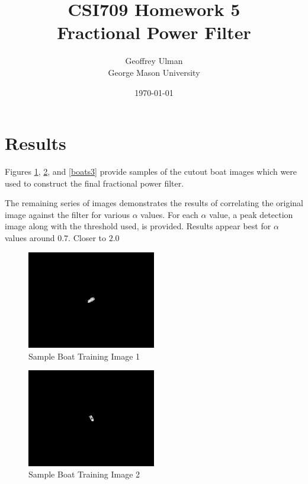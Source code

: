 \documentclass[12pt]{article}
\begin{document}
\title{CSI709 Homework 5 \\
Fractional Power Filter}
\author{
        Geoffrey Ulman \\
        George Mason University\\
}
\date{\today}

\maketitle

\section{Results}

Figures \ref{boats1}, \ref{boats2}, and \ref{boats3} provide samples of the cutout boat images which were used to construct the final fractional power filter.

The remaining series of images demonstrates the results of correlating the original image against the filter for various \(\alpha\) values. For each \(\alpha\) value, a peak detection image along with the threshold used, is provided. Results appear best for \(\alpha\) values around \(0.7\). Closer to \(2.0\)

\begin{figure}
\centering
\includegraphics[width=0.50\textwidth]{plotBoat1.png}
\caption{Sample Boat Training Image 1}
\label{boats1}
\end{figure}

\begin{figure}
\centering
\includegraphics[width=0.50\textwidth]{plotBoat2.png}
\caption{Sample Boat Training Image 2}
\label{boats2}
\end{figure}
\end{document}
